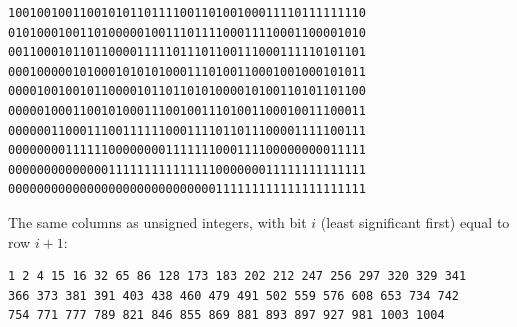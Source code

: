 \begin{verbatim}
10010010011001010110111100110100100011110111111110
01010001001101000001001110111100011110001100001010
00110001011011000011111011101100111000111110101101
00010000010100010101010001110100110001001000101011
00001001001011000010110110101000010100110101101100
00000100011001010001110010011101001100010011100011
00000011000111001111110001111011011100001111100111
00000000111111000000001111111000111100000000011111
00000000000000111111111111111000000011111111111111
00000000000000000000000000000111111111111111111111
\end{verbatim}

\noindent The same columns as unsigned integers, with bit $i$ (least
significant first) equal to row $i+1$:

\begin{verbatim}
1 2 4 15 16 32 65 86 128 173 183 202 212 247 256 297 320 329 341
366 373 381 391 403 438 460 479 491 502 559 576 608 653 734 742
754 771 777 789 821 846 855 869 881 893 897 927 981 1003 1004
\end{verbatim}
